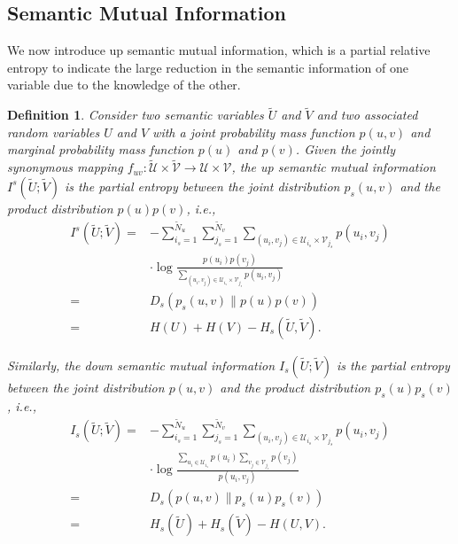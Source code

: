 \documentclass[12pt, draftclsnofoot,onecolumn]{IEEEtran}
\newtheorem{definition}{\bf{Definition}}
\begin{document}
\subsection{Semantic Mutual Information}
We now introduce up semantic mutual information, which is a partial relative entropy to indicate the large reduction in the semantic information of one variable due to the knowledge of the other.
\begin{definition}\label{definition7}
Consider two semantic variables $\tilde{U}$ and $\tilde{V}$ and two associated random variables $U$ and $V$ with a joint probability mass function $p(u,v)$ and marginal probability mass function $p(u)$ and $p(v)$. Given the jointly synonymous mapping $f_{uv}: \tilde {\mathcal{U}}\times \tilde{\mathcal{V}}\to \mathcal{U}\times{\mathcal{V}}$, the up semantic mutual information $I^s(\tilde{U};\tilde{V})$ is the partial entropy between the joint distribution $p_s\left(u,v\right)$ and the product distribution $p(u)p(v)$, i.e.,
\begin{equation}
\begin{aligned}
I^s(\tilde{U};\tilde{V})=&-\sum_{i_s=1}^{{\tilde{N}}_u}\sum_{j_s=1}^{{\tilde{N}}_v}\sum_{(u_i,v_j)\in \mathcal{U}_{i_s}\times \mathcal{V}_{j_s}}p\left(u_i,v_j\right) \\
&\cdot \log \frac{p\left(u_i\right)p\left(v_j\right)}{\sum_{(u_i,v_j) \in \mathcal{U}_{i_s} \times \mathcal{V}_{j_s}}p\left(u_i,v_j\right)}\\
=&D_s\left(p_s\left(u,v\right)\|p(u)p(v)\right)\\
=&H(U)+H(V)-H_s(\tilde{U},\tilde{V}).
\end{aligned}
\end{equation}

Similarly, the down semantic mutual information $I_s(\tilde{U};\tilde{V})$ is the partial entropy between the joint distribution $p\left(u,v\right)$ and the product distribution $p_s(u)p_s(v)$, i.e.,
\begin{equation}
\begin{aligned}
I_s (\tilde{U};\tilde{V})=&-\sum_{i_s=1}^{{\tilde{N}}_u}\sum_{j_s=1}^{{\tilde{N}}_v}\sum_{(u_i,v_j)\in \mathcal{U}_{i_s}\times \mathcal{V}_{j_s}}p\left(u_i,v_j\right)\\
 &\cdot \log \frac{\sum_{u_i \in \mathcal{U}_{i_s}}p\left(u_i\right) \sum_{v_j \in \mathcal{V}_{j_s}}p\left(v_j\right)}{p\left(u_i,v_j\right)}\\
=&D_s\left(p\left(u,v\right)\|p_s(u)p_s(v)\right)\\
=&H_s(\tilde{U})+H_s(\tilde{V})-H(U,V).
\end{aligned}
\end{equation}


\end{definition}
\end{document}

